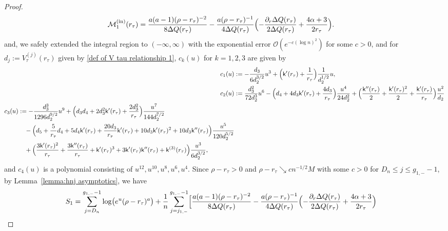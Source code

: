 \documentclass[reqno]{amsart}
\newcommand{\1}{\mathds{1}}
\numberwithin{equation}{section}
\theoremstyle{definition}
\begin{document}
\begin{proof}
\begin{align*}
\mathcal{M}_1^{(\rm in)}(r_{\tau})
&=
\frac{a(a-1)(\rho-r_{\tau})^{-2}}{8\Delta Q(r_{\tau})}
-\frac{a(\rho-r_{\tau})^{-1}}{4\Delta Q(r_{\tau})}
\Bigl( 
-\frac{\partial_r\Delta Q(r_{\tau})}{2\Delta Q(r_{\tau})}
+\frac{4\alpha+3}{2r_{\tau}}
\Bigr).
\end{align*}
and, we safely extended the integral region to $(-\infty,\infty)$ with the exponential error $\mathcal{O}(e^{-c(\log n)^2})$ for some $c>0$, and for $d_{j}:=V_{\tau}^{(j)}(r_{\tau})$ given by \eqref{def of V tau relationship 1}, $c_k(u)$ for $k=1,2,3$ are given by 
\begin{align}
\label{def of c_1}
c_1(u)&:=-\frac{d_3}{6d_2^{3/2}}u^3+\Bigl(\mathsf{k}'(r_{\tau})+\frac{1}{r_{\tau}}\Bigr)\frac{1}{d_2^{1/2}}u, 
\\
\label{def of c_2}
c_2(u)&:=\frac{d_3^2}{72d_2^3}u^6-\Bigl(d_4+4d_3\mathsf{k}'(r_{\tau})+\frac{4d_3}{r_{\tau}}\Bigr)\frac{u^4}{24d_2^2}+\Bigl(\frac{\mathsf{k}''(r_{\tau})}{2}+\frac{\mathsf{k}'(r_{\tau})^2}{2}+\frac{\mathsf{k}'(r_{\tau})}{r_{\tau}}\Bigr)\frac{u^2}{d_2}
\\
\begin{split}
\label{def of c_3}
c_3(u)&:=-\frac{d_3^3}{1296d_2^{9/2}}u^9+\Bigl(d_3d_4+2d_3^2\mathsf{k}'(r_{\tau})+\frac{2d_3^2}{r_{\tau}} \Bigr)\frac{u^7}{144d_2^{7/2}}
\\
&\quad
-\Bigl(
d_5+\frac{5}{r_{\tau}}d_4+5d_4\mathsf{k}'(r_{\tau})+\frac{20d_3}{r_{\tau}}\mathsf{k}'(r_{\tau})+10d_3\mathsf{k}'(r_{\tau})^2+10d_3\mathsf{k}''(r_{\tau})
\Bigr)
\frac{u^5}{120d_2^{5/2}}
\\
&\quad
+
\Bigl(\frac{3\mathsf{k}'(r_{\tau})^2}{r_{\tau}}
+\frac{3\mathsf{k}''(r_{\tau})}{r_{\tau}}+\mathsf{k}'(r_{\tau})^3+3\mathsf{k}'(r_{\tau})\mathsf{k}''(r_{\tau})+\mathsf{k}^{(3)}(r_{\tau})\Bigr)\frac{u^3}{6d_2^{3/2}},
\end{split}
\end{align}
and $c_4(u)$ is a polynomial consisting of $u^{12},u^{10},u^{8},u^6,u^4$.
Since $\rho-r_{\tau}>0$ and $\rho-r_{\tau}\searrow c n^{-1/2}M$ with some $c>0$ for $D_{n}\leq j\leq g_{1,-}-1$, by Lemma~\ref{lemma:hnj asymptotics}, we have 
\begin{align*}
S_1
&=
\sum_{j=D_n}^{g_{1,-}-1}
\log\bigl(e^{u}(\rho-r_{\tau})^{a}\bigr)
+\frac{1}{n}\sum_{j=j_{1,-}}^{g_{1,-}-1}
\Bigl[
\frac{a(a-1)(\rho-r_{\tau})^{-2}}{8\Delta Q(r_{\tau})}
-\frac{a(\rho-r_{\tau})^{-1}}{4\Delta Q(r_{\tau})}
\Bigl( 
-\frac{\partial_r\Delta Q(r_{\tau})}{2\Delta Q(r_{\tau})}+\frac{4\alpha+3}{2r_{\tau}}
\Bigr)

\end{align*}
\end{proof}
\end{document}
